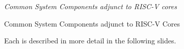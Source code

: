 \documentclass{article}
\begin{document}
\clearpage


\vspace*{3in}

\begin{center}\Huge
  \emph{Common System Components adjunct to RISC-V cores}

\vfill

\end{center}

\clearpage


\begin{center}
  {\Huge
    Common System Components adjunct to RISC-V Cores}

  \vspace*{1in}


  \vspace*{0.5in}

  {\LARGE Each is described in more detail in the following slides.}

\end{center}

\clearpage

\end{document}
